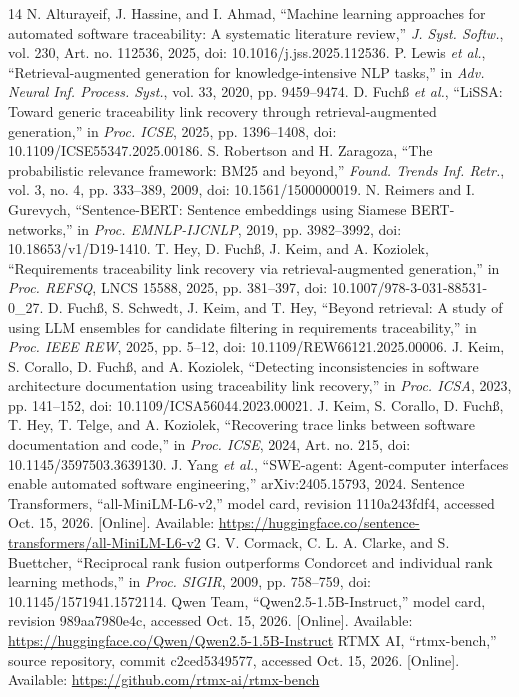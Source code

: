 \documentclass[conference,letterpaper,10pt]{IEEEtran}
\begin{document}
\begin{thebibliography}{14}
 N. Alturayeif, J. Hassine, and I. Ahmad, ``Machine learning approaches for automated software traceability: A systematic literature review,'' \emph{J. Syst. Softw.}, vol. 230, Art. no. 112536, 2025, doi: 10.1016/j.jss.2025.112536.
 P. Lewis \emph{et al.}, ``Retrieval-augmented generation for knowledge-intensive NLP tasks,'' in \emph{Adv. Neural Inf. Process. Syst.}, vol. 33, 2020, pp. 9459--9474.
 D. Fuch\ss{} \emph{et al.}, ``LiSSA: Toward generic traceability link recovery through retrieval-augmented generation,'' in \emph{Proc. ICSE}, 2025, pp. 1396--1408, doi: 10.1109/ICSE55347.2025.00186.
 S. Robertson and H. Zaragoza, ``The probabilistic relevance framework: BM25 and beyond,'' \emph{Found. Trends Inf. Retr.}, vol. 3, no. 4, pp. 333--389, 2009, doi: 10.1561/1500000019.
 N. Reimers and I. Gurevych, ``Sentence-BERT: Sentence embeddings using Siamese BERT-networks,'' in \emph{Proc. EMNLP-IJCNLP}, 2019, pp. 3982--3992, doi: 10.18653/v1/D19-1410.
 T. Hey, D. Fuch\ss{}, J. Keim, and A. Koziolek, ``Requirements traceability link recovery via retrieval-augmented generation,'' in \emph{Proc. REFSQ}, LNCS 15588, 2025, pp. 381--397, doi: 10.1007/978-3-031-88531-0\_27.
 D. Fuch\ss{}, S. Schwedt, J. Keim, and T. Hey, ``Beyond retrieval: A study of using LLM ensembles for candidate filtering in requirements traceability,'' in \emph{Proc. IEEE REW}, 2025, pp. 5--12, doi: 10.1109/REW66121.2025.00006.
 J. Keim, S. Corallo, D. Fuch\ss{}, and A. Koziolek, ``Detecting inconsistencies in software architecture documentation using traceability link recovery,'' in \emph{Proc. ICSA}, 2023, pp. 141--152, doi: 10.1109/ICSA56044.2023.00021.
 J. Keim, S. Corallo, D. Fuch\ss{}, T. Hey, T. Telge, and A. Koziolek, ``Recovering trace links between software documentation and code,'' in \emph{Proc. ICSE}, 2024, Art. no. 215, doi: 10.1145/3597503.3639130.
 J. Yang \emph{et al.}, ``SWE-agent: Agent-computer interfaces enable automated software engineering,'' arXiv:2405.15793, 2024.
 Sentence Transformers, ``all-MiniLM-L6-v2,'' model card, revision 1110a243fdf4, accessed Oct. 15, 2026. [Online]. Available: \url{https://huggingface.co/sentence-transformers/all-MiniLM-L6-v2}
 G. V. Cormack, C. L. A. Clarke, and S. Buettcher, ``Reciprocal rank fusion outperforms Condorcet and individual rank learning methods,'' in \emph{Proc. SIGIR}, 2009, pp. 758--759, doi: 10.1145/1571941.1572114.
 Qwen Team, ``Qwen2.5-1.5B-Instruct,'' model card, revision 989aa7980e4c, accessed Oct. 15, 2026. [Online]. Available: \url{https://huggingface.co/Qwen/Qwen2.5-1.5B-Instruct}
 RTMX AI, ``rtmx-bench,'' source repository, commit c2ced5349577, accessed Oct. 15, 2026. [Online]. Available: \url{https://github.com/rtmx-ai/rtmx-bench}
\end{thebibliography}
\end{document}
